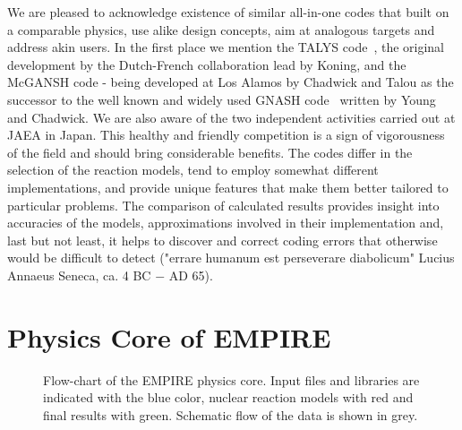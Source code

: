 \documentclass[twocolumn,amsmath,amssymb,10pt,groupedaddress,letter]{revtex4}
\begin{document}
We are pleased to acknowledge existence of similar all-in-one codes that built on a comparable physics, use alike design concepts, aim at analogous targets and address akin users. In the first place we mention the TALYS code~\cite{TALYS}, the original development by the Dutch-French collaboration lead by Koning, and the McGANSH code - being developed at Los Alamos by Chadwick and Talou as the successor to the well known and widely used GNASH code~\cite{Young:77, Young:92, Young:98} written by Young and Chadwick. We are also aware of the two independent activities carried out at JAEA in Japan. This healthy and friendly competition is a sign of vigorousness of the field and should bring considerable benefits. The codes differ in the selection of the reaction models, tend to employ somewhat different implementations, and provide unique  features that make them better tailored to particular problems. The comparison of calculated results provides insight into accuracies of the models, approximations involved in their implementation and, last but not least, it helps to discover and correct coding errors that otherwise would be difficult to detect ("errare humanum est perseverare diabolicum" Lucius Annaeus Seneca, ca. 4 BC $-$ AD 65).


\section{Physics Core of EMPIRE}

\begin{figure*}[htbp]
\caption{Flow-chart of the EMPIRE physics core. Input files and libraries are indicated with the blue color, nuclear reaction models with red and final results with green. Schematic flow of the data is shown in grey.}
\label{fig:physics-core}
\end{figure*}
\end{document}
